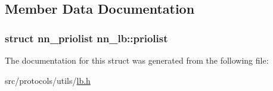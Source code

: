 \subsection{Member Data Documentation}
\subsubsection[{priolist}]{\setlength{\rightskip}{0pt plus 5cm}struct {\bf nn\+\_\+priolist} nn\+\_\+lb\+::priolist}\hypertarget{structnn__lb_a2bd049c96526c0c0423611d6a6843926}{}\label{structnn__lb_a2bd049c96526c0c0423611d6a6843926}


The documentation for this struct was generated from the following file\+:\begin{DoxyCompactItemize}
\item 
src/protocols/utils/\hyperlink{lb_8h}{lb.\+h}\end{DoxyCompactItemize}
